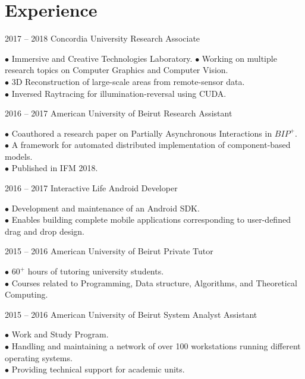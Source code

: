 \documentclass{tccv}
\begin{document}
\section{Experience}
\begin{eventlist}

\item{2017 -- 2018}
     {Concordia University}
     {Research Associate}

$\bullet$ Immersive and Creative Technologies Laboratory.
$\bullet$ Working on multiple research topics on Computer Graphics and Computer Vision.\\
$\bullet$ 3D Reconstruction of large-scale areas from remote-sensor data.\\
$\bullet$ Inversed Raytracing for illumination-reversal using CUDA.



\item{2016 -- 2017}
     {American University of Beirut}
     {Research Assistant}

$\bullet$ Coauthored a research paper on Partially Asynchronous Interactions in $BIP^+$.\\
$\bullet$ A framework for automated distributed implementation of component-based models. \\
$\bullet$ Published in IFM 2018.

\item{2016 -- 2017}
     {Interactive Life}
     {Android Developer}

$\bullet$ Development and maintenance of an Android SDK.\\
$\bullet$ Enables building complete mobile applications corresponding to user-defined drag and drop design.

\item{2015 -- 2016}
     {American University of Beirut}
     {Private Tutor}

$\bullet$ $60^+$ hours of tutoring university students.\\
$\bullet$ Courses related to Programming, Data structure, Algorithms, and Theoretical Computing.

\item{2015 -- 2016}
     {American University of Beirut}
     {System Analyst Assistant}

$\bullet$ Work and Study Program.\\
$\bullet$ Handling and maintaining a network of over 100 workstations running different operating systems. \\
$\bullet$ Providing technical support for academic units.


\end{eventlist}
\end{document}
